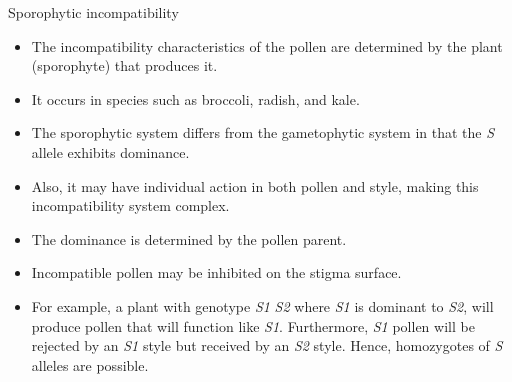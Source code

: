 \documentclass[11pt,ignorenonframetext,aspectratio=169]{beamer}
\providecommand{\tightlist}{%
  \setlength{\itemsep}{0pt}\setlength{\parskip}{0pt}}
\begin{document}
\begin{frame}{}
\protect\hypertarget{section-5}{}
\begin{block}{Sporophytic incompatibility}
\protect\hypertarget{sporophytic-incompatibility}{}
\begin{itemize}
\tightlist
\item
  The incompatibility characteristics of the pollen are determined by
  the plant (sporophyte) that produces it.
\item
  It occurs in species such as broccoli, radish, and kale.
\item
  The sporophytic system differs from the gametophytic system in that
  the \emph{S} allele exhibits dominance.
\item
  Also, it may have individual action in both pollen and style, making
  this incompatibility system complex.
\item
  The dominance is determined by the pollen parent.
\item
  Incompatible pollen may be inhibited on the stigma surface.
\item
  For example, a plant with genotype \emph{S1} \emph{S2} where \emph{S1}
  is dominant to \emph{S2}, will produce pollen that will function like
  \emph{S1}. Furthermore, \emph{S1} pollen will be rejected by an
  \emph{S1} style but received by an \emph{S2} style. Hence, homozygotes
  of \emph{S} alleles are possible.
\end{itemize}
\end{block}
\end{frame}
\end{document}
